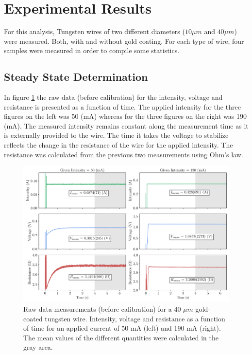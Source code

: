 \section{Experimental Results}

For this analysis, Tungsten wires of two different diameters ($10 \mu m$ and $40 \mu m$) were measured. Both, with and without gold coating. For each type of wire, four samples were measured in order to compile some statistics. 

\subsection{Steady State Determination}

In figure \ref{fig:RawMeasurements} the raw data (before calibration) for the intensity, voltage and resistance is presented as a function of time. The applied intensity for the three figures on the left was 50 (mA) whereas for the three figures on the right was 190 (mA). The measured intensity remains constant along the measurement time as it is externally provided to the wire. The time it takes the voltage to stabilize reflects the change in the resistance of the wire for the applied intensity. The resistance was calculated from the previous two measurements using Ohm's law. 

\begin{figure}[h]
    \centering
    \includegraphics[width=1.0\columnwidth]{Figure_TransientExample1/TransientExample.pdf}
    \caption{Raw data measurements (before calibration) for a 40 $\mu m$ gold-coated tungsten wire. Intensity, voltage and resistance as a function of time for an applied current of 50 mA (left) and 190 mA (right). The mean values of the different quantities were calculated in the gray area. }
    \label{fig:RawMeasurements}
\end{figure}

